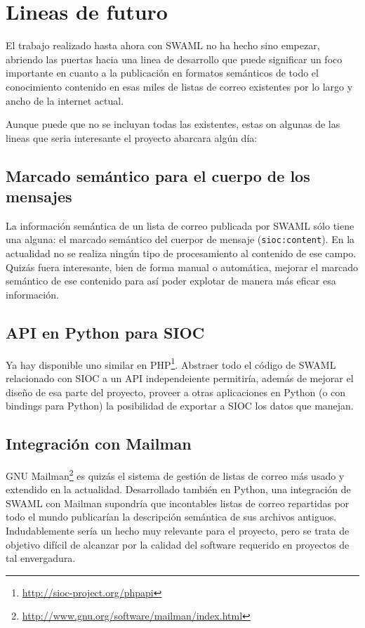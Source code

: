 
\section{Lineas de futuro}

El trabajo realizado hasta ahora con SWAML no ha hecho sino empezar, abriendo las 
puertas hacia una linea de desarrollo que puede significar un foco importante
en cuanto a la publicación en formatos semánticos de todo el conocimiento contenido
en esas miles de listas de correo existentes por lo largo y ancho de la internet
actual.

Aunque puede que no se incluyan todas las existentes, estas on algunas de las lineas
que seria interesante el proyecto abarcara algún día:

\subsection*{Marcado semántico para el cuerpo de los mensajes}

La información semántica de un lista de correo publicada por SWAML sólo tiene una
alguna: el marcado semántico del cuerpor de mensaje (\texttt{sioc:content}). En
la actualidad no se realiza ningún tipo de procesamiento al contenido de ese campo.
Quizás fuera interesante, bien de forma manual o automática, mejorar el marcado
semántico de ese contenido para así poder explotar de manera más eficar esa 
información.

\subsection*{API en Python para SIOC}

Ya hay disponible uno similar en PHP\footnote{\url{http://sioc-project.org/phpapi}}. 
Abstraer todo el código de SWAML relacionado con SIOC a un API independeiente permitiría,
además de mejorar el diseño de esa parte del proyecto, proveer a otras aplicaciones 
en Python (o con bindings para Python) la posibilidad de exportar a SIOC los datos 
que manejan.

\subsection*{Integración con Mailman}

GNU Mailman\footnote{\url{http://www.gnu.org/software/mailman/index.html}} es quizás el
sistema de gestión de listas de correo más usado y extendido en la actualidad. Desarrollado
también en Python, una integración de SWAML con Mailman supondría que incontables listas
de correo repartidas por todo el mundo publicarían la descripción semántica de sus
archivos antiguos. Indudablemente sería un hecho muy relevante para el proyecto, pero
se trata de objetivo difícil de alcanzar por la calidad del software requerido en
proyectos de tal envergadura.

